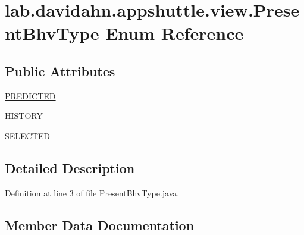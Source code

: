 \hypertarget{enumlab_1_1davidahn_1_1appshuttle_1_1view_1_1_present_bhv_type}{\section{lab.\-davidahn.\-appshuttle.\-view.\-Present\-Bhv\-Type \-Enum \-Reference}
\label{enumlab_1_1davidahn_1_1appshuttle_1_1view_1_1_present_bhv_type}
}
\subsection*{\-Public \-Attributes}
\begin{DoxyCompactItemize}
\item 
\hyperlink{enumlab_1_1davidahn_1_1appshuttle_1_1view_1_1_present_bhv_type_a13c2698d420c1bbdedc35579ddd11ee1}{\-P\-R\-E\-D\-I\-C\-T\-E\-D}
\item 
\hyperlink{enumlab_1_1davidahn_1_1appshuttle_1_1view_1_1_present_bhv_type_a0aeb072fe88c416d6306e507192a9abc}{\-H\-I\-S\-T\-O\-R\-Y}
\item 
\hyperlink{enumlab_1_1davidahn_1_1appshuttle_1_1view_1_1_present_bhv_type_a40bfb327cec370150411116ec7a50ead}{\-S\-E\-L\-E\-C\-T\-E\-D}
\end{DoxyCompactItemize}


\subsection{\-Detailed \-Description}


\-Definition at line 3 of file \-Present\-Bhv\-Type.\-java.



\subsection{\-Member \-Data \-Documentation}
\hypertarget{enumlab_1_1davidahn_1_1appshuttle_1_1view_1_1_present_bhv_type_a0aeb072fe88c416d6306e507192a9abc}{
\subsubsection[{\-H\-I\-S\-T\-O\-R\-Y}]{}}\label{enumlab_1_1davidahn_1_1appshuttle_1_1view_1_1_present_bhv_type_a0aeb072fe88c416d6306e507192a9abc}


